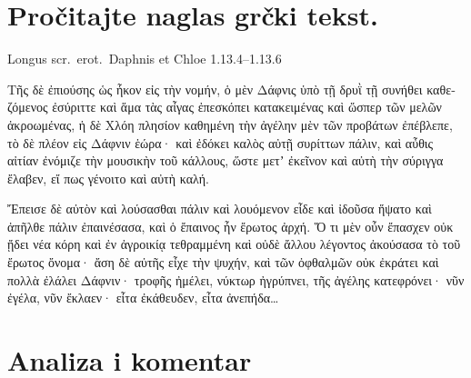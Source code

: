 \section*{Pročitajte naglas grčki tekst.}

Longus scr.~erot.\ Daphnis et Chloe 1.13.4–1.13.6


\medskip


{\large

\begin{greek}

\noindent Τῆς δὲ ἐπιούσης ὡς ἧκον εἰς τὴν νομήν, ὁ μὲν Δάφνις ὑπὸ τῇ δρυῒ τῇ συνήθει καθεζόμενος ἐσύριττε καὶ ἅμα τὰς αἶγας ἐπεσκόπει κατακειμένας καὶ ὥσπερ τῶν μελῶν ἀκροωμένας, ἡ δὲ Χλόη πλησίον καθημένη τὴν ἀγέλην μὲν τῶν προβάτων ἐπέβλεπε, τὸ δὲ πλέον εἰς Δάφνιν ἑώρα· καὶ ἐδόκει καλὸς αὐτῇ συρίττων πάλιν, καὶ αὖθις αἰτίαν ἐνόμιζε τὴν μουσικὴν τοῦ κάλλους, ὥστε μετʼ ἐκεῖνον καὶ αὐτὴ τὴν σύριγγα ἔλαβεν, εἴ πως γένοιτο καὶ αὐτὴ καλή.

Ἔπεισε δὲ αὐτὸν καὶ λούσασθαι πάλιν καὶ λουόμενον εἶδε καὶ ἰδοῦσα ἥψατο καὶ ἀπῆλθε πάλιν ἐπαινέσασα, καὶ ὁ ἔπαινος ἦν ἔρωτος ἀρχή. Ὅ τι μὲν οὖν ἔπασχεν οὐκ ᾔδει νέα κόρη καὶ ἐν ἀγροικίᾳ τεθραμμένη καὶ οὐδὲ ἄλλου λέγοντος ἀκούσασα τὸ τοῦ ἔρωτος ὄνομα· ἄση δὲ αὐτῆς εἶχε τὴν ψυχήν, καὶ τῶν ὀφθαλμῶν οὐκ ἐκράτει καὶ πολλὰ ἐλάλει Δάφνιν· τροφῆς ἠμέλει, νύκτωρ ἠγρύπνει, τῆς ἀγέλης κατεφρόνει· νῦν ἐγέλα, νῦν ἔκλαεν· εἶτα ἐκάθευδεν, εἶτα ἀνεπήδα\dots

\end{greek}

}


\section*{Analiza i komentar}



